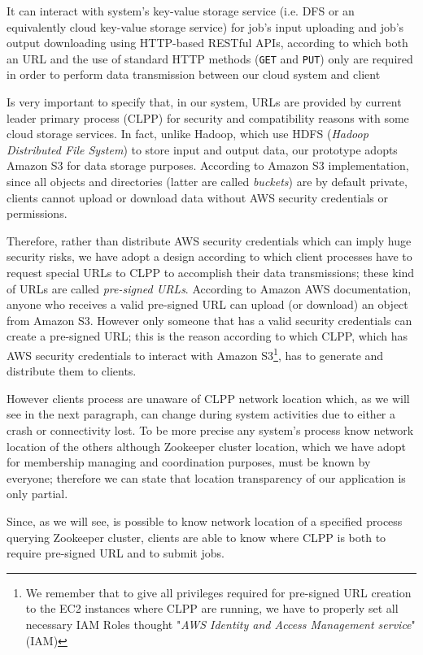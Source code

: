 \documentclass[sigchi]{acmart}
\begin{document}
It can interact with system's key-value storage service (i.e. DFS or an equivalently cloud key-value storage service) for job's input uploading and job's output downloading using HTTP-based RESTful APIs, according to which both an URL and the use of standard HTTP methods (\texttt{GET} and \texttt{PUT}) only are required in order to perform data transmission between our cloud system and client

Is very important to specify that, in our system, URLs are provided by current leader primary process (CLPP) for security and compatibility reasons with some cloud storage services. In fact, unlike Hadoop, which use HDFS (\textit{Hadoop Distributed File System}) to store input and output data, our prototype adopts Amazon S3 for data storage purposes. According to Amazon S3 implementation, since all objects and directories (latter are called \textit{buckets}) are by default private, clients cannot upload or download data without AWS security credentials or permissions.

Therefore, rather than distribute AWS security credentials which can imply huge security risks, we have adopt a design according to which client processes have to request special URLs to CLPP to accomplish their data transmissions; these kind of URLs are called \textit{pre-signed URLs}. According to Amazon AWS documentation, anyone who receives a valid pre-signed URL can upload (or download) an object from Amazon S3. However only someone that has a valid security credentials can create a pre-signed URL; this is the reason according to which CLPP, which has AWS security credentials to interact with Amazon S3\footnote{We remember that to give all privileges required for pre-signed URL creation to the EC2 instances where CLPP are running, we have to properly set all necessary IAM Roles thought "\textit{AWS Identity and Access Management service}" (IAM)}, has to generate and distribute them to clients.

However clients process are unaware of CLPP network location which, as we will see in the next paragraph, can change during system activities due to either a crash or connectivity lost. To be more precise any system's process know network location of the others although Zookeeper cluster location, which we have adopt for membership managing and coordination purposes, must be known by everyone; therefore we can state that location transparency of our application is only partial. 

Since, as we will see, is possible to know network location of a specified process querying Zookeeper cluster, clients are able to know where CLPP is both to require pre-signed URL and to submit jobs.
\end{document}
